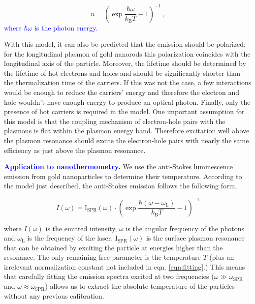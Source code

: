 \documentclass[journal=nalefd,manuscript=letter]{achemso}
\newcommand{\HI}[1]{\textcolor{blue}{#1}} %
\begin{document}
\begin{equation}\label{eqn:BE}
	\bar{n}=\left(\exp\frac{\hbar\omega}{k_\textrm{B}T}-1\right)^{-1}\,,
\end{equation}
\HI{where $\hbar\omega$ is the photon energy.}

With this model, it can also be predicted that the emission should be polarized;
for the longitudinal plasmon of gold nanorods this polarization coincides with
the longitudinal axis of the particle\cite{He2015}. Moreover, the lifetime
should be determined by the lifetime of hot electrons and holes and should be
significantly shorter than the thermalization time of the carriers. If this was
not the case, a few interactions would be enough to reduce the carriers' energy
and therefore the electron and hole wouldn't have enough energy to produce an
optical photon. Finally, only the presence of hot carriers is required in the
model. One important assumption for this model is that the coupling 
mechanism of electron-hole pairs with the plasmons is flat within the plasmon 
energy band. Therefore excitation well above the plasmon resonance should excite the 
electron-hole pairs with nearly the same efficiency as just above the plasmon
resonance\cite{Cheng2015}. 

\HI{\textbf{Application to nanothermometry.}} We use the anti-Stokes luminescence emission from gold
nanoparticles to determine their temperature. According to the model just
described, the anti-Stokes emission follows the following form,

\begin{equation}\label{eqn:fitting}
	I(\omega) =
	\textrm{I}_{\textrm{SPR}}(\omega)\cdot\left(\exp\frac{\hbar(\omega-\omega_\textrm{L})}{k_\textrm{B}T}-1\right)^{-1}
\end{equation}

\noindent where $I(\omega) $ is the emitted intensity, $\omega$ is the angular frequency
of the photons and $\omega_\textrm{L}$ is the frequency of the laser.
$\textrm{I}_{\textrm{SPR}}(\omega) $ is the surface plasmon resonance that can be
obtained by exciting the particle at energies higher than the resonance. The
only remaining free parameter is the temperature $T$ (plus an irrelevant normalization
constant not included in eqn. \ref{eqn:fitting}.) This means that carefully
fitting the emission spectra excited at two frequencies
($\omega\gg\omega_{\textrm{SPR}}$ and $\omega\approx\omega_{\textrm{SPR}}$) allows us to
extract the absolute temperature of the particles without any previous
calibration.
\end{document}
